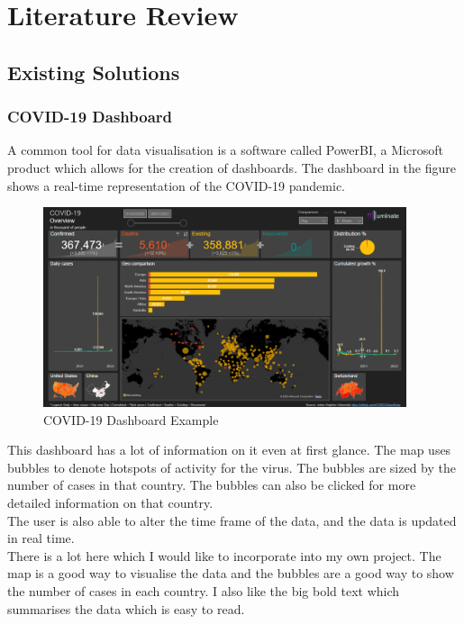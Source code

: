 \documentclass{report}
\begin{document}
\newpage

\newpage

\chapter{Literature Review}
\section{Existing Solutions}
\subsection{COVID-19 Dashboard}
A common tool for data visualisation is a software called PowerBI, a Microsoft product which allows for the creation of dashboards. 
The dashboard in the figure shows a real-time representation of the COVID-19 pandemic.
\begin{center}
    \begin{figure}[h]
        \centering
        \includegraphics[width=0.95\textwidth]{PowerBI Example.png}
        \caption{COVID-19 Dashboard Example \cite{Badr2023}}
        \label{fig:covid19_dashboard}
    \end{figure}
\end{center}
This dashboard has a lot of information on it even at first glance. The map uses bubbles to denote hotspots of activity for the virus. The bubbles are sized by the number of cases in that country. The bubbles can also be clicked for more detailed information on that country. \\
The user is also able to alter the time frame of the data, and the data is updated in real time.\\
There is a lot here which I would like to incorporate into my own project. The map is a good way to visualise the data and the bubbles are a good way to show the number of cases in each country. I also like the big bold text which summarises the data which is easy to read.\\
\newpage
\end{document}
